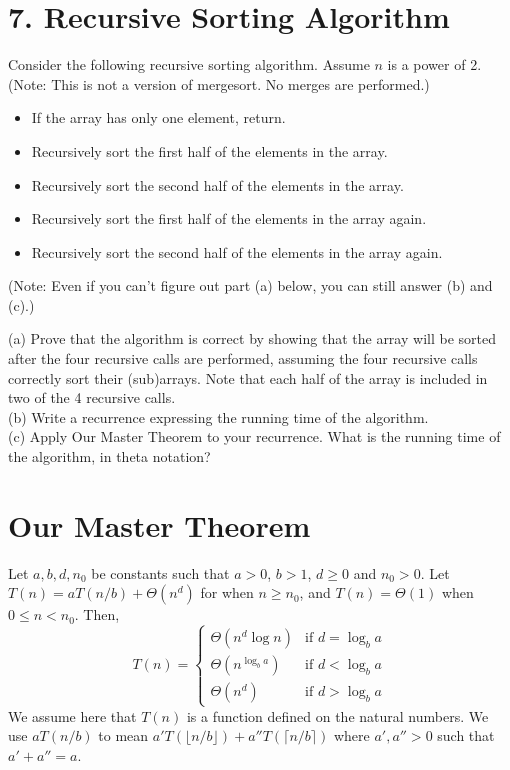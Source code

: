 \documentclass{article}
\begin{document}
\section*{7. Recursive Sorting Algorithm}
Consider the following recursive sorting algorithm. Assume $n$ is a power of 2. (Note: This is not a version of mergesort. No merges are performed.)
\begin{itemize}
    \item If the array has only one element, return.
    \item Recursively sort the first half of the elements in the array.
    \item Recursively sort the second half of the elements in the array.
    \item Recursively sort the first half of the elements in the array again.
    \item Recursively sort the second half of the elements in the array again.

\end{itemize}
(Note: Even if you can’t figure out part (a) below, you can still answer (b) and (c).)

(a) Prove that the algorithm is correct by showing that the array will be sorted after the four recursive calls are performed, assuming the four recursive calls correctly sort their (sub)arrays. Note that each half of the array is included in two of the 4 recursive calls. \\
(b) Write a recurrence expressing the running time of the algorithm. \\
(c) Apply Our Master Theorem to your recurrence. What is the running time of the algorithm, in theta notation?

\section*{Our Master Theorem}
\begin{theorem}
Let $a, b, d, n_0$ be constants such that $a > 0$, $b > 1$, $d \ge 0$ and $n_0 > 0$.
Let $T(n) = aT(n/b) + \Theta(n^d)$ for when $n \ge n_0$, and $T(n) = \Theta(1)$ when $0 \le n < n_0$. Then,
\[
T(n) = \begin{cases}
\Theta(n^d \log n) & \text{if } d = \log_b a \\
\Theta(n^{\log_b a}) & \text{if } d < \log_b a \\
\Theta(n^d) & \text{if } d > \log_b a
\end{cases}
\]
We assume here that $T(n)$ is a function defined on the natural numbers. We use $aT(n/b)$ to mean $a'T(\lfloor n/b \rfloor) + a''T(\lceil n/b \rceil)$ where $a', a'' > 0$ such that $a' + a'' = a$.
\end{theorem}
\end{document}
